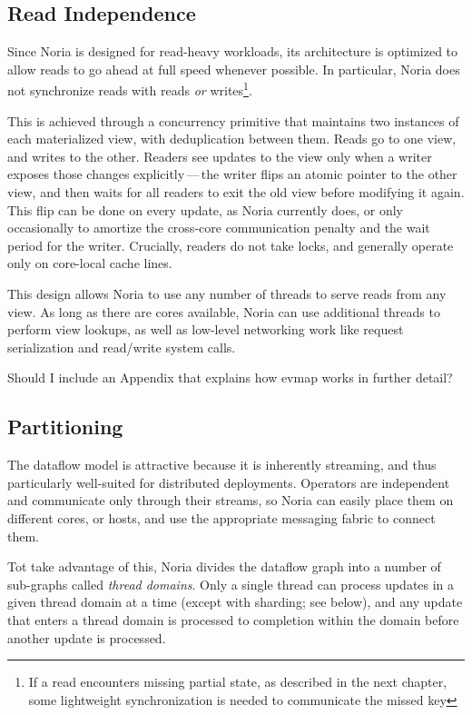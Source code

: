 \subsection{Read Independence}

Since Noria is designed for read-heavy workloads, its architecture is optimized
to allow reads to go ahead at full speed whenever possible. In particular, Noria
does not synchronize reads with reads \emph{or} writes\footnote{If a read
encounters missing partial state, as described in the next chapter, some
lightweight synchronization is needed to communicate the missed key}.

This is achieved through a concurrency primitive that maintains two instances of
each materialized view, with deduplication between them. Reads go to one view,
and writes to the other. Readers see updates to the view only when a writer
exposes those changes explicitly\,---\,the writer flips an atomic pointer to the
other view, and then waits for all readers to exit the old view before modifying
it again. This flip can be done on every update, as Noria currently does, or
only occasionally to amortize the cross-core communication penalty and the wait
period for the writer. Crucially, readers do not take locks, and generally
operate only on core-local cache lines.

This design allows Noria to use any number of threads to serve reads from any
view. As long as there are cores available, Noria can use additional threads to
perform view lookups, as well as low-level networking work like request
serialization and read/write system calls.

\begin{inprogress}
  Should I include an Appendix that explains how evmap works in further detail?
\end{inprogress}

\subsection{Partitioning}
\label{s:noria:partitioning}

The dataflow model is attractive because it is inherently streaming, and thus
particularly well-suited for distributed deployments. Operators are independent
and communicate only through their streams, so Noria can easily place them
on different cores, or hosts, and use the appropriate messaging fabric to
connect them.

Tot take advantage of this, Noria divides the dataflow graph into a number of
sub-graphs called \textit{thread domains}. Only a single thread can process
updates in a given thread domain at a time (except with sharding; see below),
and any update that enters a thread domain is processed to completion within
the domain before another update is processed.


